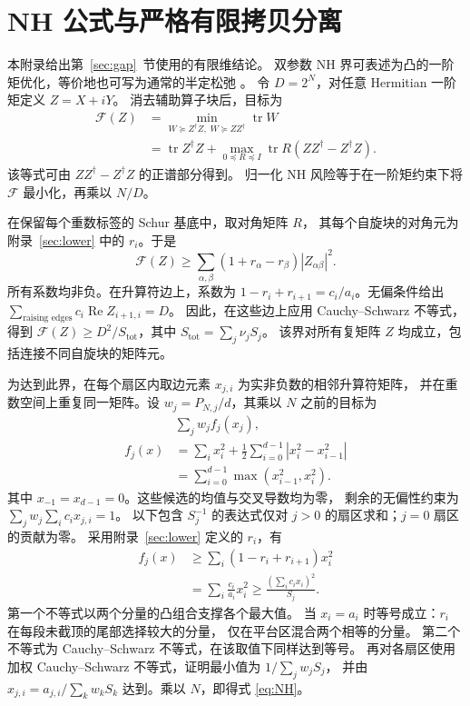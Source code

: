 \documentclass[aps,pra,reprint,superscriptaddress,longbibliography]{revtex4-2}
\theoremstyle{remark}
\DeclareMathOperator{\tr}{tr}
\begin{document}
\section{NH 公式与严格有限拷贝分离}\label{app:NH}

本附录给出第~\ref{sec:gap}~节使用的有限维结论。
双参数 NH 界可表述为凸的一阶矩优化，等价地也可写为通常的半定松弛
\cite{HayashiOuyang2023,ZhangHayashi2026}。
令 $D=2^N$，对任意 Hermitian 一阶矩定义 $Z=X+iY$。
消去辅助算子块后，目标为
\[
\begin{aligned}
\mathcal F(Z)
 &=\min_{W\succeq Z^\dagger Z,\;W\succeq ZZ^\dagger}\tr W\\
 &=\tr Z^\dagger Z+
   \max_{0\preceq R\preceq I}\tr R(ZZ^\dagger-Z^\dagger Z).
\end{aligned}
\]
该等式可由 $ZZ^\dagger-Z^\dagger Z$ 的正谱部分得到。
归一化 NH 风险等于在一阶矩约束下将 $\mathcal F$ 最小化，再乘以 $N/D$。

在保留每个重数标签的 Schur 基底中，取对角矩阵 $R$，
其每个自旋块的对角元为附录~\ref{sec:lower} 中的 $r_i$。于是
\[
 \mathcal F(Z)\geq
 \sum_{\alpha,\beta}(1+r_\alpha-r_\beta)|Z_{\alpha\beta}|^2.
\]
所有系数均非负。在升算符边上，系数为
$1-r_i+r_{i+1}=c_i/a_i$。无偏条件给出
$\sum_{\text{raising edges}}c_i\operatorname{Re}Z_{i+1,i}=D$。
因此，在这些边上应用 Cauchy--Schwarz 不等式，得到
$\mathcal F(Z)\geq D^2/S_{\mathrm{tot}}$，其中
$S_{\mathrm{tot}}=\sum_j\nu_jS_j$。
该界对所有复矩阵 $Z$ 均成立，包括连接不同自旋块的矩阵元。

为达到此界，在每个扇区内取边元素 $x_{j,i}$ 为实非负数的相邻升算符矩阵，
并在重数空间上重复同一矩阵。设 $w_j=P_{N,j}/d$，其乘以 $N$ 之前的目标为
\begin{equation}
\begin{aligned}
&\sum_jw_j f_j(x_j),\\
f_j(x)&=\sum_i x_i^2+\frac12\sum_{i=0}^{d-1}|x_i^2-x_{i-1}^2|\\
&=\sum_{i=0}^{d-1}\max(x_{i-1}^2,x_i^2).
\end{aligned}
\label{eq:NH-objective}
\end{equation}
其中 $x_{-1}=x_{d-1}=0$。这些候选的均值与交叉导数均为零，
剩余的无偏性约束为 $\sum_jw_j\sum_i c_ix_{j,i}=1$。
以下包含 $S_j^{-1}$ 的表达式仅对 $j>0$ 的扇区求和；$j=0$ 扇区的贡献为零。
采用附录~\ref{sec:lower} 定义的 $r_i$，有
\begin{equation}
\begin{aligned}
f_j(x)&\geq\sum_i(1-r_i+r_{i+1})x_i^2\\
&=\sum_i\frac{c_i}{a_i}x_i^2
\geq\frac{(\sum_i c_ix_i)^2}{S_j}.
\end{aligned}
\label{eq:NH-CS}
\end{equation}
第一个不等式以两个分量的凸组合支撑各个最大值。
当 $x_i=a_i$ 时等号成立：$r_i$ 在每段未截顶的尾部选择较大的分量，
仅在平台区混合两个相等的分量。
第二个不等式为 Cauchy--Schwarz 不等式，在该取值下同样达到等号。
再对各扇区使用加权 Cauchy--Schwarz 不等式，证明最小值为 $1/\sum_jw_jS_j$，
并由 $x_{j,i}=a_{j,i}/\sum_kw_kS_k$ 达到。乘以 $N$，即得式 \eqref{eq:NH}。
\end{document}
